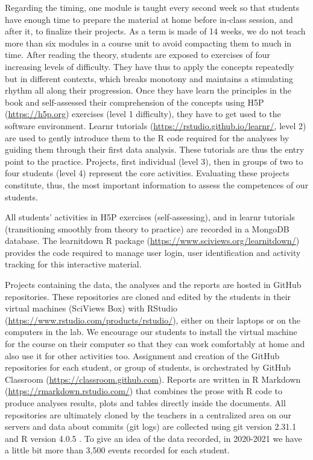 \documentclass{aims}
\theoremstyle{definition}
\begin{document}
Regarding the timing, one module is taught every second week so that
students have enough time to prepare the material at home before
in-class session, and after it, to finalize their projects. As a term is
made of 14 weeks, we do not teach more than six modules in a course unit
to avoid compacting them to much in time. After reading the theory,
students are exposed to exercises of four increasing levels of
difficulty. They have thus to apply the concepts repeatedly but in
different contexts, which breaks monotony and maintains a stimulating
rhythm all along their progression. Once they have learn the principles
in the book and self-assessed their comprehension of the concepts using
H5P (\url{https://h5p.org}) exercises (level 1 difficulty), they have to
get used to the software environment. Learnr tutorials
(\url{https://rstudio.github.io/learnr/}, level 2) are used to gently
introduce them to the R code required for the analyses by guiding them
through their first data analysis. These tutorials are thus the entry
point to the practice. Projects, first individual (level 3), then in
groups of two to four students (level 4) represent the core activities.
Evaluating these projects constitute, thus, the most important
information to assess the competences of our students.

All students' activities in H5P exercises (self-assessing), and in
learnr tutorials (transitioning smoothly from theory to practice) are
recorded in a MongoDB database. The learnitdown R package
(\url{https://www.sciviews.org/learnitdown/}) provides the code required
to manage user login, user identification and activity tracking for this
interactive material.

Projects containing the data, the analyses and the reports are hosted in
GitHub repositories. These repositories are cloned and edited by the
students in their virtual machines (SciViews Box) with RStudio
(\url{https://www.rstudio.com/products/rstudio/}), either on their
laptops or on the computers in the lab. We encourage our students to
install the virtual machine for the course on their computer so that
they can work comfortably at home and also use it for other activities
too. Assignment and creation of the GitHub repositories for each
student, or group of students, is orchestrated by GitHub Classroom
(\url{https://classroom.github.com}). Reports are written in R Markdown
(\url{https://rmarkdown.rstudio.com/}) that combines the prose with R
code to produce analyses results, plots and tables directly inside the
documents. All repositories are ultimately cloned by the teachers in a
centralized area on our servers and data about commits (git logs) are
collected using git version 2.31.1 and R version 4.0.5
\cite{Rcoreteam2021}. To give an idea of the data recorded, in 2020-2021
we have a little bit more than 3,500 events recorded for each student.
\end{document}

